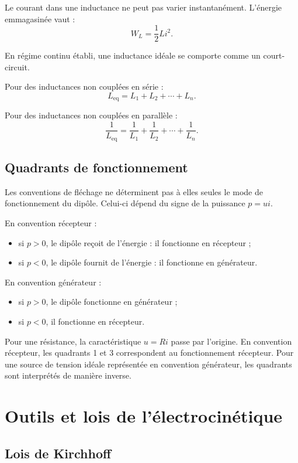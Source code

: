 Le courant dans une inductance ne peut pas varier instantanément. L'énergie emmagasinée vaut :
\[
W_L=\frac{1}{2}Li^2.
\]

En régime continu établi, une inductance idéale se comporte comme un court-circuit.

Pour des inductances non couplées en série :
\[
L_{\mathrm{eq}}=L_1+L_2+\cdots+L_n.
\]

Pour des inductances non couplées en parallèle :
\[
\frac{1}{L_{\mathrm{eq}}}=\frac{1}{L_1}+\frac{1}{L_2}+\cdots+\frac{1}{L_n}.
\]

\subsection{Quadrants de fonctionnement}

Les conventions de fléchage ne déterminent pas à elles seules le mode de fonctionnement du dipôle. Celui-ci dépend du signe de la puissance $p=ui$.

En convention récepteur :
\begin{itemize}
  \item si $p>0$, le dipôle reçoit de l'énergie : il fonctionne en récepteur ;
  \item si $p<0$, le dipôle fournit de l'énergie : il fonctionne en générateur.
\end{itemize}

En convention générateur :
\begin{itemize}
  \item si $p>0$, le dipôle fonctionne en générateur ;
  \item si $p<0$, il fonctionne en récepteur.
\end{itemize}

Pour une résistance, la caractéristique $u=Ri$ passe par l'origine. En convention récepteur, les quadrants 1 et 3 correspondent au fonctionnement récepteur. Pour une source de tension idéale représentée en convention générateur, les quadrants sont interprétés de manière inverse.

\section{Outils et lois de l'électrocinétique}\label{sec:elec-lois}

\subsection{Lois de Kirchhoff}

